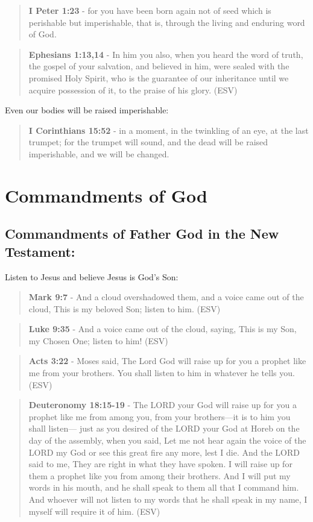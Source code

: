 \documentclass[11pt]{article}
\begin{document}
\begin{quote}
\textbf{I Peter 1:23} - for you have been born again not of seed which is perishable but imperishable, that is, through the living and enduring word of God.
\end{quote}

\begin{quote}
\textbf{Ephesians 1:13,14} -  In him you also, when you heard the word of truth, the gospel of your salvation, and believed in him, were sealed with the promised Holy Spirit, who is the guarantee of our inheritance until we acquire possession of it, to the praise of his glory.  (ESV)
\end{quote}

Even our bodies will be raised imperishable:

\begin{quote}
\textbf{I Corinthians 15:52} - in a moment, in the twinkling of an eye, at the last trumpet; for the trumpet will sound, and the dead will be raised imperishable, and we will be changed.
\end{quote}

\section{Commandments of God}
\label{sec:org990ec61}
\subsection{Commandments of Father God in the New Testament:}
\label{sec:org4d6829a}
Listen to Jesus and believe Jesus is God's Son:

\begin{quote}
\textbf{Mark 9:7} - And a cloud overshadowed them, and a voice came out of the cloud, This is my beloved Son; listen to him. (ESV)
\end{quote}

\begin{quote}
\textbf{Luke 9:35} - And a voice came out of the cloud, saying, This is my Son, my Chosen One; listen to him! (ESV)
\end{quote}

\begin{quote}
\textbf{Acts 3:22} - Moses said, The Lord God will raise up for you a prophet like me from your brothers. You shall listen to him in whatever he tells you. (ESV)
\end{quote}

\begin{quote}
\textbf{Deuteronomy 18:15-19} - The LORD your God will raise up for you a prophet like me from among you, from your brothers—it is to him you shall listen— just as you desired of the LORD your God at Horeb on the day of the assembly, when you said, Let me not hear again the voice of the LORD my God or see this great fire any more, lest I die. And the LORD said to me, They are right in what they have spoken. I will raise up for them a prophet like you from among their brothers. And I will put my words in his mouth, and he shall speak to them all that I command him. And whoever will not listen to my words that he shall speak in my name, I myself will require it of him. (ESV)
\end{quote}
\end{document}
